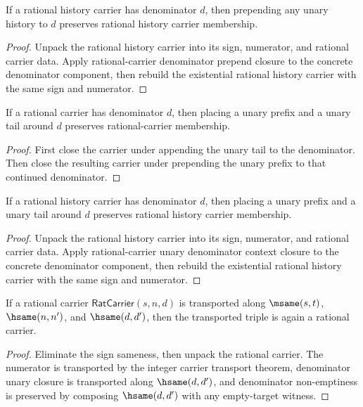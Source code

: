 \begin{theorem}
\label{thm:rat-history-carrier-prepend-unary-denominator-closed}
If a rational history carrier has denominator \(d\), then prepending any unary
history to \(d\) preserves rational history carrier membership.
\end{theorem}
\begin{proof}
Unpack the rational history carrier into its sign, numerator, and rational
carrier data. Apply rational-carrier denominator prepend closure to the
concrete denominator component, then rebuild the existential rational history
carrier with the same sign and numerator.
\end{proof}

\begin{theorem}
\label{thm:rat-carrier-unary-denominator-context-closed}
If a rational carrier has denominator \(d\), then placing a unary prefix and a
unary tail around \(d\) preserves rational-carrier membership.
\end{theorem}
\begin{proof}
First close the carrier under appending the unary tail to the denominator.
Then close the resulting carrier under prepending the unary prefix to that
continued denominator.
\end{proof}

\begin{theorem}
\label{thm:rat-history-carrier-unary-denominator-context-closed}
If a rational history carrier has denominator \(d\), then placing a unary
prefix and a unary tail around \(d\) preserves rational history carrier
membership.
\end{theorem}
\begin{proof}
Unpack the rational history carrier into its sign, numerator, and rational
carrier data. Apply rational-carrier unary denominator context closure to the
concrete denominator component, then rebuild the existential rational history
carrier with the same sign and numerator.
\end{proof}

\begin{theorem}
\label{thm:rat-carrier-hsame-transport}
If a rational carrier \(\mathsf{RatCarrier}(s,n,d)\) is transported along
\(\msame(s,t)\), \(\hsame(n,n')\), and \(\hsame(d,d')\), then the transported
triple is again a rational carrier.
\end{theorem}
\begin{proof}
Eliminate the sign sameness, then unpack the rational carrier. The numerator
is transported by the integer carrier transport theorem, denominator unary
closure is transported along \(\hsame(d,d')\), and denominator non-emptiness is
preserved by composing \(\hsame(d,d')\) with any empty-target witness.
\end{proof}
